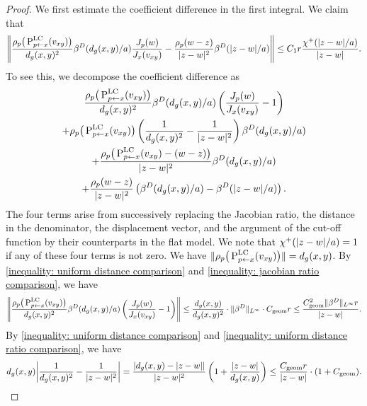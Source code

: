 \documentclass[a4paper,oneside,12pt]{amsart}
\theoremstyle{plain}
\theoremstyle{definition}
\theoremstyle{remark}
\DeclarePairedDelimiter{\abs}{\lvert}{\rvert}
\DeclarePairedDelimiter{\norm}{\lVert}{\rVert}
\newcommand{\paralleltransport}[2]{\operatorname{P}_{#2 \gets #1}}
\newcommand{\paralleltransportLC}[2]{\paralleltransport{#1}{#2}^{\mathrm{LC}}}
\newcommand{\cliffordmultiplication}{\rho}
\newcommand{\cutoff}{\beta}
\newcommand{\cutoffDirac}{\cutoff^D}
\newcommand{\cutoffupper}{\chi^+}
\newcommand{\constantgeometric}{C_{\mathrm{geom}}}
\begin{document}
\begin{proof}
  We first estimate the coefficient difference in the first integral.
  We claim that
  \begin{equation}\label{inequality: coefficients comparison}
    \norm*{\frac{\cliffordmultiplication_p \big(\paralleltransportLC{x}{p}(v_{xy})\big)}{d_g(x,y)^2} \cutoffDirac(d_g(x,y)/a) \frac{J_p(w)}{J_x(v_{xy})} - \frac{\cliffordmultiplication_p(w-z) }{\abs{z-w}^2} \cutoffDirac(\abs{z-w}/a)} \le C_1 r\frac{\cutoffupper(\abs{z-w}/a)}{\abs{z-w}}.
  \end{equation}
  To see this, we decompose the coefficient difference as
  \begin{multline}
      \frac{\cliffordmultiplication_p \big(\paralleltransportLC{x}{p}(v_{xy})\big)}{d_g(x,y)^2} \cutoffDirac(d_g(x,y)/a) \left(\frac{J_p(w)}{J_x(v_{xy})} - 1\right) \\
      + \cliffordmultiplication_p \big(\paralleltransportLC{x}{p}(v_{xy})\big) \left(\frac{1}{d_g(x,y)^2} - \frac{1}{\abs{z-w}^2}\right) \cutoffDirac(d_g(x,y)/a) \\
      + \frac{\cliffordmultiplication_p \big(\paralleltransportLC{x}{p}(v_{xy}) - (w-z)\big)}{\abs{z-w}^2} \cutoffDirac(d_g(x,y)/a) \\
      + \frac{\cliffordmultiplication_p(w-z)}{\abs{z-w}^2} \left(\cutoffDirac(d_g(x,y)/a) - \cutoffDirac(\abs{z-w}/a)\right).
  \end{multline}
  The four terms arise from successively replacing the Jacobian ratio, the distance in the denominator, the displacement vector, and the argument of the cut-off function by their counterparts in the flat model.
  We note that $\cutoffupper(\abs{z-w}/a) = 1$ if any of these four terms is not zero.
  We have $\norm{\cliffordmultiplication_p \big(\paralleltransportLC{x}{p}(v_{xy})\big)} = d_g(x,y)$.
  By \eqref{inequality: uniform distance comparison} and \eqref{inequality: jacobian ratio comparison}, we have
  \begin{equation}
    \norm*{\frac{\cliffordmultiplication_p \big(\paralleltransportLC{x}{p}(v_{xy})\big)}{d_g(x,y)^2} \cutoffDirac(d_g(x,y)/a) \left(\frac{J_p(w)}{J_x(v_{xy})} - 1\right)} \le \frac{d_g(x,y)}{d_g(x,y)^2} \cdot \norm{\cutoffDirac}_{L^{\infty}} \cdot \constantgeometric r \le \frac{\constantgeometric^2 \norm{\cutoffDirac}_{L^{\infty}} r}{\abs{z-w}}.
  \end{equation}
  By \eqref{inequality: uniform distance comparison} and \eqref{inequality: uniform distance ratio comparison}, we have
  \begin{equation}
    d_g(x,y) \abs*{\frac{1}{d_g(x,y)^2}-\frac{1}{\abs{z-w}^2}} = \frac{\abs*{d_g(x,y)-\abs{z-w}}}{\abs{z-w}^2} \left(1+\frac{\abs{z-w}}{d_g(x,y)}\right) \le\frac{\constantgeometric r}{\abs{z-w}} \cdot (1+\constantgeometric).

\end{equation}
\end{proof}
\end{document}
